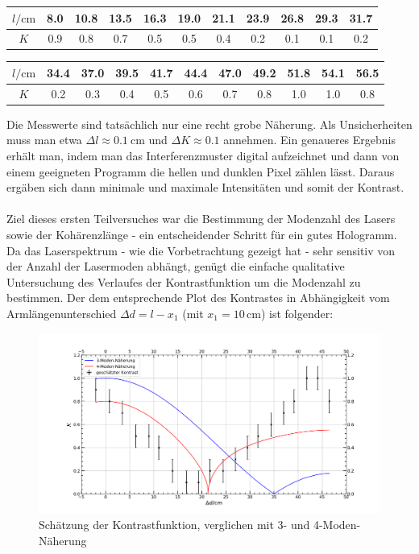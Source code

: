 \documentclass[german,  %
parskip=full,  %
]{scrartcl}
\begin{document}
\begin{table}[h!]\centering
\begin{tabular}{|c|c|c|c|c|c|c|c|c|c|c|}\hline
\(l / \mathrm{cm}\) & 8.0 &10.8 &13.5 &16.3 &19.0 &21.1 &23.9 &26.8 &29.3 &31.7 \\\hline
\(K\)  & 0.9 &0.8 &0.7 &0.5 &0.5 &0.4 &0.2 &0.1 &0.1 &0.2 \\\hline
\end{tabular}
\end{table}



\begin{table}[h!]\centering
\begin{tabular}{|c|c|c|c|c|c|c|c|c|c|c|}\hline
\(l / \mathrm{cm}\) & 34.4&37.0& 39.5& 41.7& 44.4& 47.0&49.2&51.8&54.1&56.5  \\\hline
\(K\)& 0.2&0.3 &0.4 &0.5 &0.6 &0.7 &0.8 &1.0 &1.0 &0.8 \\\hline
\end{tabular}
\end{table}
Die Messwerte sind tatsächlich nur eine recht grobe Näherung. Als Unsicherheiten muss man etwa \(\Delta l \approx 0.1 \ \mathrm{cm}\) und \(\Delta K \approx 0.1\) annehmen. Ein genaueres Ergebnis erhält man, indem man das Interferenzmuster digital aufzeichnet und dann von einem geeigneten Programm die hellen und dunklen Pixel zählen lässt. Daraus ergäben sich dann minimale und maximale Intensitäten und somit der Kontrast. \\\\
Ziel dieses ersten Teilversuches war die Bestimmung der Modenzahl des Lasers sowie der Kohärenzlänge - ein entscheidender Schritt für ein gutes Hologramm. Da das Laserspektrum - wie die Vorbetrachtung gezeigt hat - sehr sensitiv von der Anzahl der Lasermoden abhängt, genügt die einfache qualitative Untersuchung des Verlaufes der Kontrastfunktion um die Modenzahl zu bestimmen. Der dem entsprechende Plot des Kontrastes in Abhängigkeit vom Armlängenunterschied $\Delta d = l - x_{1}$ (mit $x_{1} = 10 \, \text{cm}$) ist folgender:
\\
\begin{figure}[h!]\centering
\includegraphics[scale=0.4]{Kontrastschaetzung_Experiment.png}
\caption{Schätzung der Kontrastfunktion, verglichen mit 3- und 4-Moden-Näherung} 
\end{figure}
\end{document}
